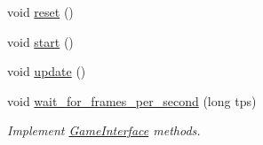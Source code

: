 \begin{DoxyCompactItemize}
\item 
void \hyperlink{classAsteroids_1_1Domain_1_1Game_1_1Game_a61e639ba44b16737fdfe26887dba965f}{reset} ()
\item 
void \hyperlink{classAsteroids_1_1Domain_1_1Game_1_1Game_a824018131c10d49c8addd305ff36209b}{start} ()
\item 
void \hyperlink{classAsteroids_1_1Domain_1_1Game_1_1Game_aa63114be578393b0113f116798346ac4}{update} ()
\item 
void \hyperlink{classAsteroids_1_1Domain_1_1Game_1_1Game_ab586cddf7972dbb9313ad3b241b550b4}{wait\+\_\+for\+\_\+frames\+\_\+per\+\_\+second} (long tps)
\begin{DoxyCompactList}\small\item\em Implement \hyperlink{classAsteroids_1_1Domain_1_1Game_1_1GameInterface}{Game\+Interface} methods. \end{DoxyCompactList}\end{DoxyCompactItemize}
